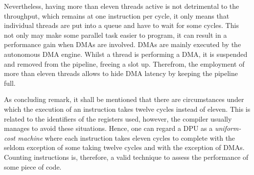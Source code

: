 Nevertheless, having more than eleven threads active is not detrimental to the throughput, which remains at one instruction per cycle, it only means that individual threads are put into a queue and have to wait for some cycles.
This not only may make some parallel task easier to program, it can result in a performance gain when \acp{DMA} are involved.
\Acp{DMA} are mainly executed by the autonomous \ac{DMA} engine.
Whilst a thread is performing a \ac{DMA}, it is suspended and removed from the pipeline, freeing a slot up.
Therefrom, the employment of more than eleven threads allows to hide \ac{DMA} latency by keeping the pipeline full.

As concluding remark, it shall be mentioned that there are circumstances under which the execution of an instruction takes twelve cycles instead of eleven.
This is related to the identifiers of the registers used, however, the compiler usually manages to avoid these situations.
Hence, one can regard a \ac{DPU} as a \emph{uniform-cost machine} where each instruction takes eleven cycles to complete with the seldom exception of some taking twelve cycles and with the exception of \acp{DMA}.
Counting instructions is, therefore, a valid technique to assess the performance of some piece of code.
